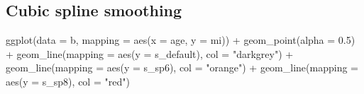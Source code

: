 \documentclass[
]{book}
\newenvironment{Shaded}{\begin{snugshade}}{\end{snugshade}}
\newcommand{\AttributeTok}[1]{\textcolor[rgb]{0.77,0.63,0.00}{#1}}
\newcommand{\FloatTok}[1]{\textcolor[rgb]{0.00,0.00,0.81}{#1}}
\newcommand{\FunctionTok}[1]{\textcolor[rgb]{0.00,0.00,0.00}{#1}}
\newcommand{\NormalTok}[1]{#1}
\newcommand{\OtherTok}[1]{\textcolor[rgb]{0.56,0.35,0.01}{#1}}
\newcommand{\SpecialCharTok}[1]{\textcolor[rgb]{0.00,0.00,0.00}{#1}}
\newcommand{\StringTok}[1]{\textcolor[rgb]{0.31,0.60,0.02}{#1}}
\begin{document}
\begin{Shaded}
\end{Shaded}

\hypertarget{cubic-spline-smoothing-1}{%
\subsection{Cubic spline smoothing}\label{cubic-spline-smoothing-1}}

\begin{Shaded}
\begin{Highlighting}[]
\FunctionTok{ggplot}\NormalTok{(}\AttributeTok{data =}\NormalTok{ b, }
       \AttributeTok{mapping =} \FunctionTok{aes}\NormalTok{(}\AttributeTok{x =}\NormalTok{ age, }\AttributeTok{y =}\NormalTok{ mi)) }\SpecialCharTok{+}
  \FunctionTok{geom\_point}\NormalTok{(}\AttributeTok{alpha =} \FloatTok{0.5}\NormalTok{) }\SpecialCharTok{+} 
  \FunctionTok{geom\_line}\NormalTok{(}\AttributeTok{mapping =} \FunctionTok{aes}\NormalTok{(}\AttributeTok{y =}\NormalTok{ s\_default), }\AttributeTok{col =} \StringTok{"darkgrey"}\NormalTok{) }\SpecialCharTok{+}
  \FunctionTok{geom\_line}\NormalTok{(}\AttributeTok{mapping =} \FunctionTok{aes}\NormalTok{(}\AttributeTok{y =}\NormalTok{ s\_sp6), }\AttributeTok{col =} \StringTok{"orange"}\NormalTok{) }\SpecialCharTok{+} 
  \FunctionTok{geom\_line}\NormalTok{(}\AttributeTok{mapping =} \FunctionTok{aes}\NormalTok{(}\AttributeTok{y =}\NormalTok{ s\_sp8), }\AttributeTok{col =} \StringTok{"red"}\NormalTok{)}
\end{Highlighting}
\end{Shaded}
\end{document}
